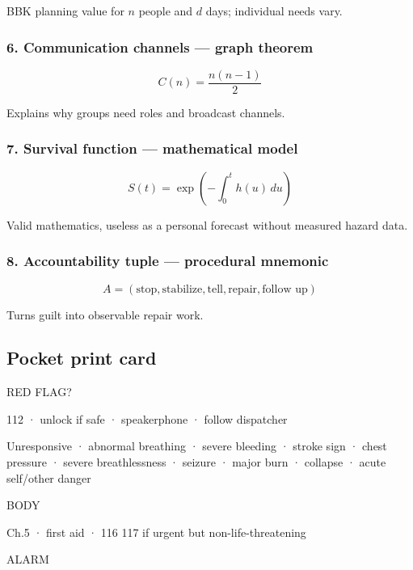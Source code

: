BBK planning value for \(n\) people and \(d\) days; individual needs
vary.

\hypertarget{communication-channels-graph-theorem}{%
\subsubsection{6. Communication channels --- graph
theorem}\label{communication-channels-graph-theorem}}

\[C(n)=\frac{n(n-1)}{2}\]

Explains why groups need roles and broadcast channels.

\hypertarget{survival-function-mathematical-model}{%
\subsubsection{7. Survival function --- mathematical
model}\label{survival-function-mathematical-model}}

\[S(t)=\exp\left(-\int_0^t h(u)\,du\right)\]

Valid mathematics, useless as a personal forecast without measured
hazard data.

\hypertarget{accountability-tuple-procedural-mnemonic}{%
\subsubsection{8. Accountability tuple --- procedural
mnemonic}\label{accountability-tuple-procedural-mnemonic}}

\[A=(\text{stop},\text{stabilize},\text{tell},\text{repair},\text{follow up})\]

Turns guilt into observable repair work.

\hypertarget{pocket-print-card}{%
\subsection{Pocket print card}\label{pocket-print-card}}

RED FLAG?

112 · unlock if safe · speakerphone · follow dispatcher

Unresponsive · abnormal breathing · severe bleeding · stroke sign ·
chest pressure · severe breathlessness · seizure · major burn · collapse
· acute self/other danger

BODY

Ch.5 · first aid · 116 117 if urgent but non-life-threatening

ALARM


